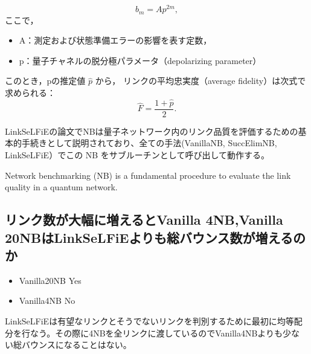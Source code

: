 \documentclass[technicalreport,dvipdfmx]{ieicej}
\begin{document}
\[
b_m = A p^{2m},
\]
ここで，

\begin{itemize}
\item A：測定および状態準備エラーの影響を表す定数，
\item p：量子チャネルの脱分極パラメータ（depolarizing parameter）
\end{itemize}


このとき，pの推定値 \(\hat{p}\) から，
リンクの平均忠実度（average fidelity）は次式で求められる：
\[
\hat{F} = \frac{1 + \hat{p}}{2}.
\]

LinkSeLFiEの論文でNBは量子ネットワーク内のリンク品質を評価するための基
本的手続きとして説明されており、全ての手法(VanillaNB, SuccElimNB,
LinkSeLFiE）でこの NB をサブルーチンとして呼び出して動作する。

Network benchmarking (NB) is a fundamental procedure to evaluate the link quality in a quantum network.


\subsection{リンク数が大幅に増えるとVanilla 4NB,Vanilla 20NBはLinkSeLFiEよりも総バウンス数が増えるのか}
\label{sec:orgca763b8}
\begin{itemize}
\item Vanilla20NB Yes
\item Vanilla4NB No
\end{itemize}

LinkSeLFiEは有望なリンクとそうでないリンクを判別するために最初に均等配
分を行なう。その際に4NBを全リンクに渡しているのでVanilla4NBよりも少な
い総バウンスになることはない。
\end{document}

